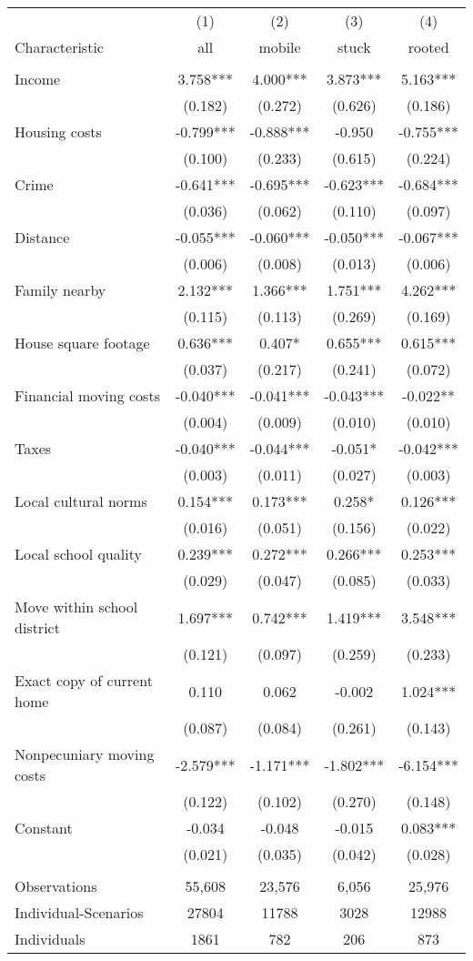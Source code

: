 \begin{tabular}{lcccc} \hline
 & (1) & (2) & (3) & (4) \\
Characteristic & all & mobile & stuck & rooted \\ \hline
 &  &  &  &  \\
Income & 3.758*** & 4.000*** & 3.873*** & 5.163*** \\
 & (0.182) & (0.272) & (0.626) & (0.186) \\
Housing costs & -0.799*** & -0.888*** & -0.950 & -0.755*** \\
 & (0.100) & (0.233) & (0.615) & (0.224) \\
Crime & -0.641*** & -0.695*** & -0.623*** & -0.684*** \\
 & (0.036) & (0.062) & (0.110) & (0.097) \\
Distance & -0.055*** & -0.060*** & -0.050*** & -0.067*** \\
 & (0.006) & (0.008) & (0.013) & (0.006) \\
Family nearby & 2.132*** & 1.366*** & 1.751*** & 4.262*** \\
 & (0.115) & (0.113) & (0.269) & (0.169) \\
House square footage & 0.636*** & 0.407* & 0.655*** & 0.615*** \\
 & (0.037) & (0.217) & (0.241) & (0.072) \\
Financial moving costs & -0.040*** & -0.041*** & -0.043*** & -0.022** \\
 & (0.004) & (0.009) & (0.010) & (0.010) \\
Taxes & -0.040*** & -0.044*** & -0.051* & -0.042*** \\
 & (0.003) & (0.011) & (0.027) & (0.003) \\
Local cultural norms & 0.154*** & 0.173*** & 0.258* & 0.126*** \\
 & (0.016) & (0.051) & (0.156) & (0.022) \\
Local school quality & 0.239*** & 0.272*** & 0.266*** & 0.253*** \\
 & (0.029) & (0.047) & (0.085) & (0.033) \\
Move within school district & 1.697*** & 0.742*** & 1.419*** & 3.548*** \\
 & (0.121) & (0.097) & (0.259) & (0.233) \\
Exact copy of current home & 0.110 & 0.062 & -0.002 & 1.024*** \\
 & (0.087) & (0.084) & (0.261) & (0.143) \\
Nonpecuniary moving costs & -2.579*** & -1.171*** & -1.802*** & -6.154*** \\
 & (0.122) & (0.102) & (0.270) & (0.148) \\
Constant & -0.034 & -0.048 & -0.015 & 0.083*** \\
 & (0.021) & (0.035) & (0.042) & (0.028) \\
 &  &  &  &  \\
Observations & 55,608 & 23,576 & 6,056 & 25,976 \\
Individual-Scenarios & 27804 & 11788 & 3028 & 12988 \\
 Individuals & 1861 & 782 & 206 & 873 \\ \hline
\end{tabular}
